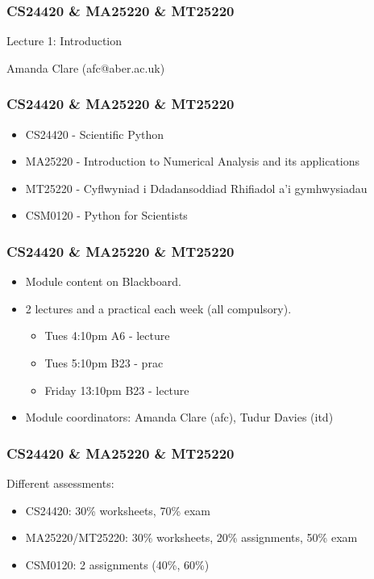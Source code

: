 \documentclass{beamer}
\begin{document}
\begin{frame}
\frametitle{CS24420 \& MA25220 \& MT25220}

\begin{center}
\begin{huge}
Lecture 1: Introduction 
\end{huge}
\bigskip

Amanda Clare (afc@aber.ac.uk)

\end{center}
\end{frame}

\begin{frame}
\frametitle{CS24420 \& MA25220 \& MT25220}
\begin{itemize}
\item CS24420 - Scientific Python
\item MA25220 - Introduction to Numerical Analysis and its
  applications
\item MT25220 - Cyflwyniad i Ddadansoddiad Rhifiadol a'i gymhwysiadau
\item CSM0120 - Python for Scientists
\end{itemize}
\end{frame}

\begin{frame}
\frametitle{CS24420 \& MA25220 \& MT25220}
\begin{itemize}
\item Module content on Blackboard.
\item 2 lectures and a practical each week (all compulsory).
\begin{itemize}
\item Tues 4:10pm A6 - lecture
\item Tues 5:10pm B23 - prac
\item Friday 13:10pm B23 - lecture 
\end{itemize}
\item Module coordinators: Amanda Clare (afc), Tudur Davies (itd)
\end{itemize}
\end{frame}

\begin{frame}
\frametitle{CS24420 \& MA25220 \& MT25220}
Different assessments:
\begin{itemize}
\item CS24420: 30\% worksheets, 70\% exam
\item MA25220/MT25220: 30\% worksheets, 20\% assignments, 50\% exam
\item CSM0120: 2 assignments (40\%, 60\%) 
\end{itemize}
\end{frame}
\end{document}
